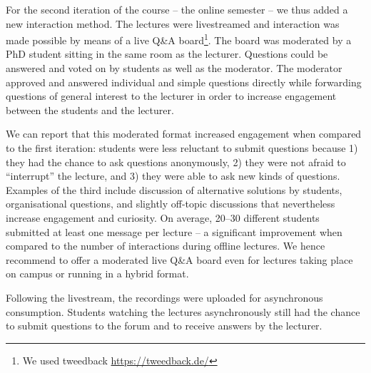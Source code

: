 For the second iteration of the course -- the online semester --
we thus added a new interaction method.
The lectures were livestreamed and
interaction was made possible by means of a live Q\&A board\footnote{We used tweedback \url{https://tweedback.de/}}.
The board was moderated by a PhD student
sitting in the same room as the lecturer.
Questions could be answered and voted on by students as well as the moderator.
The moderator approved and answered individual and simple questions directly while forwarding questions of general interest to the lecturer in order to increase engagement between the students and the lecturer.

We can report that this moderated format increased engagement when compared to the first iteration:
students were less reluctant to submit questions because
1) they had the chance to ask questions anonymously,
2) they were not afraid to ``interrupt'' the lecture, and
3) they were able to ask new kinds of questions.
Examples of the third include discussion of alternative solutions by students,
organisational questions,
and slightly off-topic discussions that nevertheless increase engagement and curiosity.
On average, 20--30 different students
submitted at least one message per lecture -- a significant improvement when compared to the number of interactions during offline lectures.
We hence recommend to offer a moderated live Q\&A board even for lectures taking place on campus or running in a hybrid format.

Following the livestream,
the recordings were uploaded for asynchronous consumption.
Students watching the lectures asynchronously still had the chance to submit questions to the forum and to receive answers by the lecturer.

